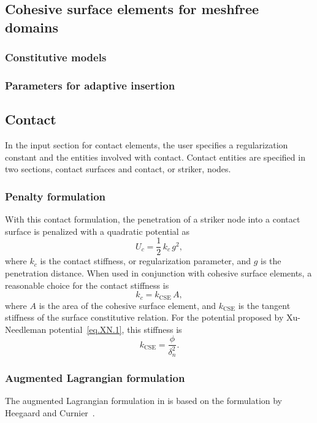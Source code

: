 \subsection{Cohesive surface elements for meshfree domains}
\label{section.element.CSE.MF}

\subsubsection{Constitutive models}
\subsubsection{Parameters for adaptive insertion}

\subsection{Contact}
In the input section for contact elements, the user
specifies a regularization constant and the entities involved with 
contact. Contact entities are specified in two sections, contact 
surfaces and contact, or striker, nodes.
\subsubsection{Penalty formulation}
With this contact formulation, the penetration of a striker node into a 
contact surface is penalized with a quadratic potential as
\begin{equation}
U_{c}= \frac{1}{2}\,k_{c}\,g^{2},
\end{equation}
where $k_{c}$ is the contact stiffness, or regularization parameter,
and $g$ is the penetration 
distance. When used in conjunction with cohesive surface elements, a 
reasonable choice for the contact stiffness is
\begin{equation}
k_{c}=k_{\text{CSE}}\,A,
\end{equation}
where $A$ is the area of the cohesive surface element, and 
$k_{\text{CSE}}$ is the tangent stiffness of the surface 
constitutive relation. For the potential proposed by 
Xu-Needleman potential~\ref{eq.XN.1},
this stiffness is
\begin{equation}
k_{\text{CSE}} = \frac{\phi}{\delta_{n}^{2}}.
\end{equation}

\subsubsection{Augmented Lagrangian formulation}
The augmented Lagrangian formulation in \tahoe is based on the 
formulation by Heegaard and Curnier~\cite{Heegaard1993}.

